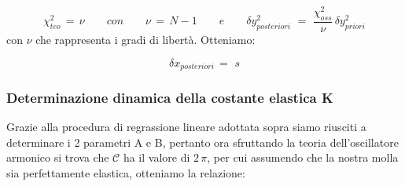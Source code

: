 \begin{equation*}
	\chi_{teo}^2 \,=\, \nu \quad \quad con \quad \quad
	\nu \,=\, N - 1 \quad \quad e \quad \quad
	\delta y_{posteriori}^2 \,\,=\,\, \frac{\chi_{oss}^2}{\nu} \, \delta y_{priori}^2
\end{equation*}
%
con $\nu$ che rappresenta i gradi di libertà. Otteniamo:

\begin{equation*}
	\delta x_{posteriori} \,=\,  \,s
\end{equation*}	 

\subsubsection{Determinazione dinamica della costante elastica K}
Grazie alla procedura di regrassione lineare adottata sopra siamo riusciti a determinare i 2 parametri A e B, pertanto ora sfruttando la teoria dell'oscillatore armonico si trova che $\mathcal{C}$ ha il valore di $2 \, \pi$, per cui assumendo che la nostra molla sia perfettamente elastica, otteniamo la relazione:

